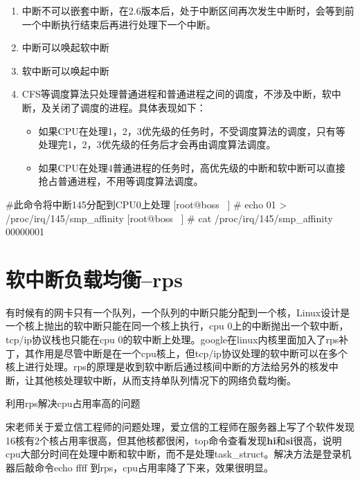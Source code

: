 \begin{enumerate}
  \item 中断不可以嵌套中断，在2.6版本后，处于中断区间再次发生中断时，会等到前一个中断执行结束后再进行处理下一个中断。
  \item 中断可以唤起软中断
  \item 软中断可以唤起中断
  \item CFS等调度算法只处理普通进程和普通进程之间的调度，不涉及中断，软中断，及关闭了调度的进程。具体表现如下：\begin{itemize}
        \item 如果CPU在处理1，2，3优先级的任务时，不受调度算法的调度，只有等处理完1，2，3优先级的任务后才会再由调度算法调度。
        \item 如果CPU在处理4普通进程的任务时，高优先级的中断和软中断可以直接抢占普通进程，不用等调度算法调度。
        \end{itemize}
\end{enumerate}
\begin{latexcmd}[label= 中断分配到CPU方法]
#此命令将中断145分配到CPU0上处理
[root@boss ~] # echo 01 > /proc/irq/145/smp_affinity
[root@boss ~] # cat /proc/irq/145/smp_affinity
			00000001
\end{latexcmd}
\section{软中断负载均衡--rps}
有时候有的网卡只有一个队列，一个队列的中断只能分配到一个核，Linux设计是一个核上抛出的软中断只能在同一个核上执行，cpu 0上的中断抛出一个软中断，tcp/ip协议栈也只能在cpu 0的软中断上处理。google在linux内核里面加入了rps补丁，其作用是尽管中断是在一个cpu核上，但tcp/ip协议处理的软中断可以在多个核上进行处理。rps的原理是收到软中断后通过核间中断的方法给另外的核发中断，让其他核处理软中断，从而支持单队列情况下的网络负载均衡。
\begin{example*}
  \wdexpbox
  {\caption{利用rps解决cpu占用率高的问题}}
  {宋老师关于爱立信工程师的问题处理，爱立信的工程师在服务器上写了个软件发现16核有2个核占用率很高，但其他核都很闲，top命令查看发现\textbf{hi}和\textbf{si}很高，说明cpu大部分时间在处理中断和软中断，而不是处理task\_struct。解决方法是登录机器后敲命令echo ffff 到rps，cpu占用率降了下来，效果很明显。}
\end{example*}

